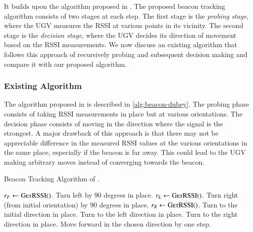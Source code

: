 \documentclass[conference]{IEEEtran}
\begin{document}
It builds upon the algorithm proposed in
\cite{dubeyNavigationCommunicationUGV2022}.
The proposed beacon tracking algorithm consists of two stages at each step. The
first stage is the \emph{probing stage}, where the UGV measures the RSSI at
various points in its vicinity. The second stage is the \emph{decision stage},
where the UGV decides its direction of movement based on the RSSI measurements.
We now discuss an existing algorithm that follows this approach of recursively
probing and subsequent decision making and compare it with our proposed
algorithm.

\subsubsection{Existing Algorithm}
\label{subsubsec:existing-algorithm}

The algorithm proposed in \cite{dubeyNavigationCommunicationUGV2022} is
described in \autoref{alg:beacon-dubey}. The probing phase consists of taking
RSSI measurements in place but at various orientations. The decision phase
consists of moving in the direction where the signal is the strongest. A major
drawback of this approach is that there may not be appreciable difference in the
measured RSSI values at the various orientations in the same place, especially
if the beacon is far away. This could lead to the UGV making arbitrary moves
instead of converging towards the beacon.

\begin{algorithm}[H]
    \caption{Beacon Tracking Algorithm of \cite{dubeyNavigationCommunicationUGV2022}.}
    \label{alg:beacon-dubey}
    \begin{algorithmic}[1]
            \State \(r_F \gets \textsc{GetRSSI()}\).
            \State Turn left by 90 degrees in place.
            \State \(r_L \gets \textsc{GetRSSI()}\).
            \State Turn right (from initial orientation) by 90 degrees in place.
            \State \(r_R \gets \textsc{GetRSSI()}\).
                \State Turn to the initial direction in place.
                \State Turn to the left direction in place.
                \State Turn to the right direction in place.
            \EndIf
            \State Move forward in the chosen direction by one step.
        \EndWhile
    \end{algorithmic}
\end{algorithm}
\end{document}
